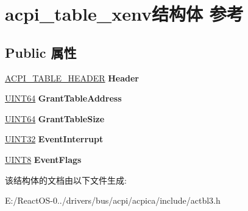 \hypertarget{structacpi__table__xenv}{}\section{acpi\+\_\+table\+\_\+xenv结构体 参考}
\label{structacpi__table__xenv}
\subsection*{Public 属性}
\begin{DoxyCompactItemize}
\item 
\mbox{\label{structacpi__table__xenv_aa8e39d19efa8893702ab45703c5809eb}} 
\hyperlink{structacpi__table__header}{A\+C\+P\+I\+\_\+\+T\+A\+B\+L\+E\+\_\+\+H\+E\+A\+D\+ER} {\bfseries Header}
\item 
\mbox{\label{structacpi__table__xenv_afc6df5be2dad454a0acaf7a6d0e09540}} 
\hyperlink{_processor_bind_8h_a57be03562867144161c1bfee95ca8f7c}{U\+I\+N\+T64} {\bfseries Grant\+Table\+Address}
\item 
\mbox{\label{structacpi__table__xenv_ac04e2e79647189bd0fa33993c9df71da}} 
\hyperlink{_processor_bind_8h_a57be03562867144161c1bfee95ca8f7c}{U\+I\+N\+T64} {\bfseries Grant\+Table\+Size}
\item 
\mbox{\label{structacpi__table__xenv_a8e516e4708206851bc3f2199cc9f8b75}} 
\hyperlink{_processor_bind_8h_ae1e6edbbc26d6fbc71a90190d0266018}{U\+I\+N\+T32} {\bfseries Event\+Interrupt}
\item 
\mbox{\label{structacpi__table__xenv_a9cbc1d6a585c65975d78020c6fbacc32}} 
\hyperlink{_processor_bind_8h_ab27e9918b538ce9d8ca692479b375b6a}{U\+I\+N\+T8} {\bfseries Event\+Flags}
\end{DoxyCompactItemize}


该结构体的文档由以下文件生成\+:\begin{DoxyCompactItemize}
\item 
E\+:/\+React\+O\+S-\/0../drivers/bus/acpi/acpica/include/actbl3.\+h\end{DoxyCompactItemize}
